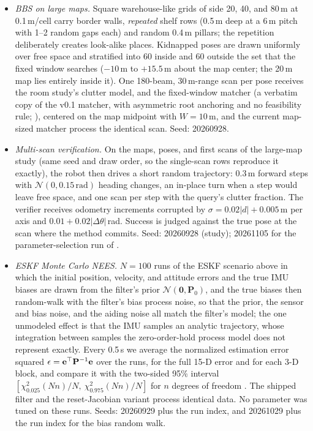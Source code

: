 \begin{itemize}
  \item \emph{BBS on large maps.} Square warehouse-like grids of side 20, 40, and 80\,m at 0.1\,m/cell carry border walls, \emph{repeated} shelf rows (0.5\,m deep at a 6\,m pitch with 1--2 random gaps each) and random 0.4\,m pillars; the repetition deliberately creates look-alike places. Kidnapped poses are drawn uniformly over free space and stratified into 60 inside and 60 outside the set that the fixed window searches ($-10$\,m to $+15.5$\,m about the map center; the 20\,m map lies entirely inside it). One 180-beam, 30\,m-range scan per pose receives the room study's clutter model, and the fixed-window matcher (a verbatim copy of the v0.1 matcher, with asymmetric root anchoring and no feasibility rule; ), centered on the map midpoint with $W=10$\,m, and the current map-sized matcher process the identical scan. Seed: 20260928.
  \item \emph{Multi-scan verification.} On the maps, poses, and first scans of the large-map study (same seed and draw order, so the single-scan rows reproduce it exactly), the robot then drives a short random trajectory: 0.3\,m forward steps with $\mathcal{N}(0,0.15\,\mathrm{rad})$ heading changes, an in-place turn when a step would leave free space, and one scan per step with the query's clutter fraction. The verifier receives odometry increments corrupted by $\sigma=0.02|d|+0.005$\,m per axis and $0.01+0.02|\Delta\theta|$\,rad. Success is judged against the true pose at the scan where the method commits. Seed: 20260928 (study); 20261105 for the parameter-selection run of .
  \item \emph{ESKF Monte Carlo NEES.} $N=100$ runs of the ESKF scenario above in which the initial position, velocity, and attitude errors and the true IMU biases are drawn from the filter's prior $\mathcal{N}(\mathbf{0},\mathbf{P}_0)$, and the true biases then random-walk with the filter's bias process noise, so that the prior, the sensor and bias noise, and the aiding noise all match the filter's model; the one unmodeled effect is that the IMU samples an analytic trajectory, whose integration between samples the zero-order-hold process model does not represent exactly. Every 0.5\,s we average the normalized estimation error squared $\epsilon=\mathbf{e}^{\top}\mathbf{P}^{-1}\mathbf{e}$ over the runs, for the full 15-D error and for each 3-D block, and compare it with the two-sided 95\% interval $[\chi^2_{0.025}(N n)/N,\ \chi^2_{0.975}(N n)/N]$ for $n$ degrees of freedom \citep{barshalom2001estimation}. The shipped filter and the reset-Jacobian variant process identical data. No parameter was tuned on these runs. Seeds: 20260929 plus the run index, and 20261029 plus the run index for the bias random walk.
\end{itemize}

